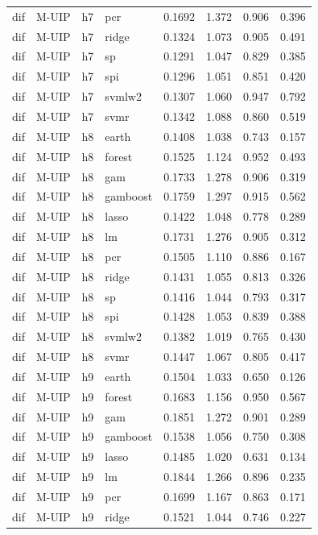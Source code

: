\begin{ThreePartTable}
\begin{longtable}[t]{llclcccc}
dif & M-UIP & h7 & pcr & 0.1692 & 1.372 & 0.906 & 0.396\\
dif & M-UIP & h7 & ridge & 0.1324 & 1.073 & 0.905 & 0.491\\
dif & M-UIP & h7 & sp & 0.1291 & 1.047 & 0.829 & 0.385\\
dif & M-UIP & h7 & spi & 0.1296 & 1.051 & 0.851 & 0.420\\
dif & M-UIP & h7 & svmlw2 & 0.1307 & 1.060 & 0.947 & 0.792\\
dif & M-UIP & h7 & svmr & 0.1342 & 1.088 & 0.860 & 0.519\\
\addlinespace
dif & M-UIP & h8 & earth & 0.1408 & 1.038 & 0.743 & 0.157\\
dif & M-UIP & h8 & forest & 0.1525 & 1.124 & 0.952 & 0.493\\
dif & M-UIP & h8 & gam & 0.1733 & 1.278 & 0.906 & 0.319\\
dif & M-UIP & h8 & gamboost & 0.1759 & 1.297 & 0.915 & 0.562\\
dif & M-UIP & h8 & lasso & 0.1422 & 1.048 & 0.778 & 0.289\\
dif & M-UIP & h8 & lm & 0.1731 & 1.276 & 0.905 & 0.312\\
dif & M-UIP & h8 & pcr & 0.1505 & 1.110 & 0.886 & 0.167\\
dif & M-UIP & h8 & ridge & 0.1431 & 1.055 & 0.813 & 0.326\\
dif & M-UIP & h8 & sp & 0.1416 & 1.044 & 0.793 & 0.317\\
dif & M-UIP & h8 & spi & 0.1428 & 1.053 & 0.839 & 0.388\\
dif & M-UIP & h8 & svmlw2 & 0.1382 & 1.019 & 0.765 & 0.430\\
dif & M-UIP & h8 & svmr & 0.1447 & 1.067 & 0.805 & 0.417\\
\addlinespace
dif & M-UIP & h9 & earth & 0.1504 & 1.033 & 0.650 & 0.126\\
dif & M-UIP & h9 & forest & 0.1683 & 1.156 & 0.950 & 0.567\\
dif & M-UIP & h9 & gam & 0.1851 & 1.272 & 0.901 & 0.289\\
dif & M-UIP & h9 & gamboost & 0.1538 & 1.056 & 0.750 & 0.308\\
dif & M-UIP & h9 & lasso & 0.1485 & 1.020 & 0.631 & 0.134\\
dif & M-UIP & h9 & lm & 0.1844 & 1.266 & 0.896 & 0.235\\
dif & M-UIP & h9 & pcr & 0.1699 & 1.167 & 0.863 & 0.171\\
dif & M-UIP & h9 & ridge & 0.1521 & 1.044 & 0.746 & 0.227\\

\end{longtable}
\end{ThreePartTable}
